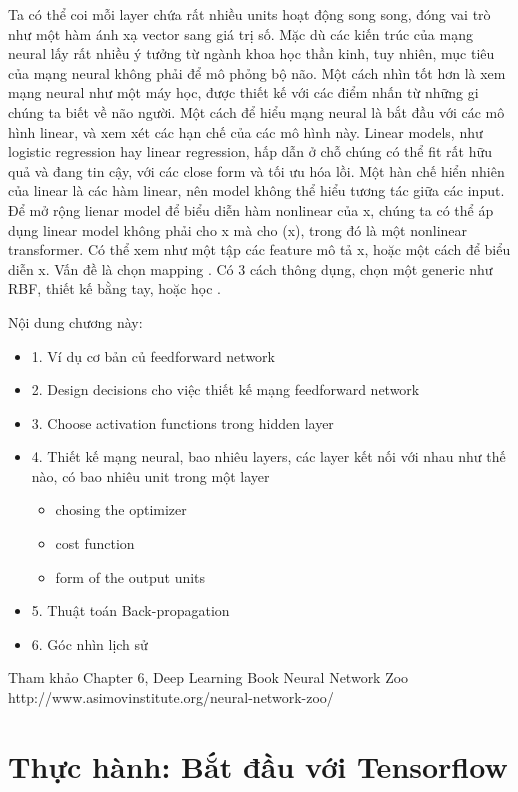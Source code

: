 Ta có thể coi mỗi layer chứa rất nhiều units hoạt động song song, đóng vai trò như một hàm ánh xạ vector sang giá trị số. Mặc dù các kiến trúc của mạng neural lấy rất nhiều ý tưởng từ ngành khoa học thần kinh, tuy nhiên, mục tiêu của mạng neural không phải để mô phỏng bộ não. Một cách nhìn tốt hơn là xem mạng neural như một máy học, được thiết kế với các điểm nhấn từ những gi chúng ta biết về não người.
Một cách để hiểu mạng neural là bắt đầu với các mô hình linear, và xem xét các hạn chế của các mô hình này. Linear models, như logistic regression hay linear regression, hấp dẫn ở chỗ chúng có thể fit rất hữu quả và đang tin cậy, với các close form và tối ưu hóa lồi. Một hàn chế hiển nhiên của linear là các hàm linear, nên model không thể hiểu tương tác giữa các input.
Để mở rộng lienar model để biểu diễn hàm nonlinear của x, chúng ta có thể áp dụng linear model không phải cho x mà cho (x), trong đó  là một nonlinear transformer. Có thể xem như một tập các feature mô tả x, hoặc một cách để biểu diễn x. Vấn đề là chọn mapping . Có 3 cách thông dụng, chọn một generic  như RBF, thiết kế  bằng tay, hoặc học .

Nội dung chương này:

\begin{itemize}
  \item 1. Ví dụ cơ bản củ feedforward network
  \item 2. Design decisions cho việc thiết kế mạng feedforward network
  \item 3. Choose activation functions trong hidden layer
  \item 4. Thiết kế mạng neural, bao nhiêu layers, các layer kết nối với nhau như thế nào, có bao nhiêu unit trong một layer
  \begin{itemize}
    \item chosing the optimizer
    \item cost function
    \item form of the output units
  \end{itemize}
  \item 5. Thuật toán Back-propagation
  \item 6. Góc nhìn lịch sử
\end{itemize}


Tham khảo
Chapter 6, Deep Learning Book
Neural Network Zoo http://www.asimovinstitute.org/neural-network-zoo/


\section{Thực hành: Bắt đầu với Tensorflow}

